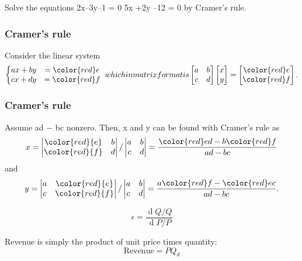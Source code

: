 \documentclass{beamer}
\begin{document}
\begin{frame}
Solve the equations 
2x--3y--1 = 0
5x +2y --12 = 0 by
Cramer’s rule.
\end{frame}

\begin{frame}
\frametitle{Cramer's rule}


Consider the linear system
\[ \left\{\begin{matrix}ax+by&={\color{red}e}\\ cx + dy&= {\color{red}f}\end{matrix}\right.\  which in matrix format is \begin{bmatrix} a & b \\ c & d \end{bmatrix}\begin{bmatrix} x \\ y \end{bmatrix}=\begin{bmatrix} {\color{red}e} \\ {\color{red}f} \end{bmatrix}.\]
\end{frame}

\begin{frame}
\frametitle{Cramer's rule}
Assume ad − bc nonzero. Then, x and y can be found with Cramer's rule as
\[x = \begin{vmatrix} \color{red}{e} & b \\ \color{red}{f} & d \end{vmatrix}/\begin{vmatrix} a & b \\ c & d \end{vmatrix}  = { {\color{red}e}d - b{\color{red}f} \over ad - bc} \]
and
\[y = \begin{vmatrix} a & \color{red}{e} \\ c & \color{red}{f} \end{vmatrix}/\begin{vmatrix} a & b \\ c & d \end{vmatrix}  = { a{\color{red}f} - {\color{red}e}c \over ad - bc}.\]
\end{frame}


\begin{frame}
\[ \epsilon = \frac{\operatorname d Q/Q}{\operatorname d P/P} \]



 Revenue is simply the product of unit price times quantity:
  \[﻿ \mbox{Revenue} = PQ_d﻿\]
\end{frame}
\end{document}
